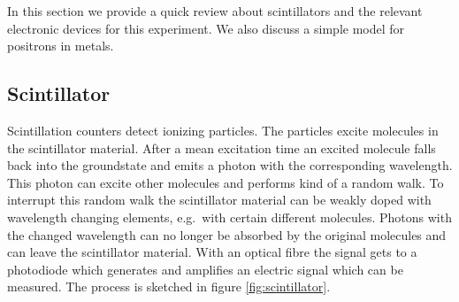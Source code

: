 In this section we provide a quick review about scintillators and the relevant electronic devices for this experiment. We also discuss a simple model for positrons in metals.

\subsection{Scintillator}
Scintillation counters detect ionizing particles. The particles excite molecules in the scintillator material. After a mean excitation time an excited molecule falls back into the groundstate and emits a photon with the corresponding wavelength. This photon can excite other molecules and performs kind of a random walk. To interrupt this random walk the scintillator material can be weakly doped with wavelength changing elements, e.g.\ with certain different molecules. Photons with the changed wavelength can no longer be absorbed by the original molecules and can leave the scintillator material. With an optical fibre the signal gets to a photodiode which generates and amplifies an electric signal which can be measured. The process is sketched in figure \ref{fig:scintillator}.
